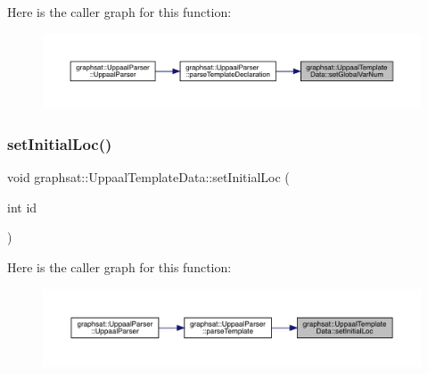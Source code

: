 Here is the caller graph for this function\+:
\nopagebreak
\begin{figure}[H]
\begin{center}
\leavevmode
\includegraphics[width=350pt]{classgraphsat_1_1_uppaal_template_data_af659c4040700ad25b760b279ae962f46_icgraph}
\end{center}
\end{figure}
\mbox{\label{classgraphsat_1_1_uppaal_template_data_a49f5c5b18a2c487342febeec63133261}} 
\subsubsection{\texorpdfstring{setInitialLoc()}{setInitialLoc()}}
{\footnotesize\ttfamily void graphsat\+::\+Uppaal\+Template\+Data\+::set\+Initial\+Loc (\begin{DoxyParamCaption}\item[{int}]{id }\end{DoxyParamCaption})\hspace{0.3cm}{\ttfamily [inline]}}

Here is the caller graph for this function\+:
\nopagebreak
\begin{figure}[H]
\begin{center}
\leavevmode
\includegraphics[width=350pt]{classgraphsat_1_1_uppaal_template_data_a49f5c5b18a2c487342febeec63133261_icgraph}
\end{center}
\end{figure}
\mbox{\label{classgraphsat_1_1_uppaal_template_data_aa2b446cbeeba08745805811e07e9d45b}} 

